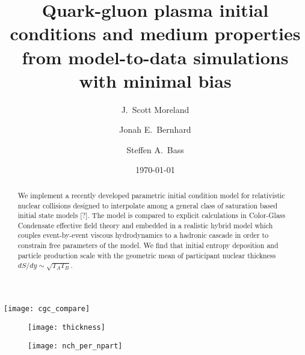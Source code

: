 \documentclass[aps,prc,reprint,amsmath]{revtex4-1}
\begin{document}
\title{Quark-gluon plasma initial conditions and medium properties \\ from model-to-data simulations with minimal bias}

\author{J.\ Scott Moreland}
\author{Jonah E.\ Bernhard}
\author{Steffen A.\ Bass}

\date{\today}


\begin{abstract}
  We implement a recently developed parametric initial condition model for relativistic nuclear collisions designed to interpolate among a general class of saturation based initial state models [?]. The model is compared to explicit calculations in Color-Glass Condensate effective field theory and embedded in a realistic hybrid model which couples event-by-event viscous hydrodynamics to a hadronic cascade in order to constrain free parameters of the model. We find that initial entropy deposition and particle production scale with the geometric mean of participant nuclear thickness $dS/dy \sim \sqrt{T_A T_B}$. 
\end{abstract}


\maketitle





\begin{figure*}
    \texttt{[image: cgc\_compare]}
\end{figure*}

\begin{figure}
    \texttt{[image: thickness]}
\end{figure}

\begin{figure}
    \texttt{[image: nch\_per\_npart]}
\end{figure}

\end{document}
